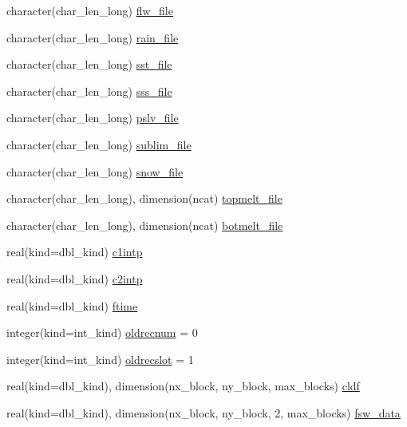 \begin{DoxyCompactItemize}
\item 
character(char\_\-len\_\-long) \hyperlink{namespaceice__forcing_a80a3c80bad2ac9ab38aff61fdaf8084e}{flw\_\-file}
\item 
character(char\_\-len\_\-long) \hyperlink{namespaceice__forcing_a872adfb9cc20037a1b0dc19f317438bd}{rain\_\-file}
\item 
character(char\_\-len\_\-long) \hyperlink{namespaceice__forcing_a33afd2f71d0f18c27e6a2e78388dbb31}{sst\_\-file}
\item 
character(char\_\-len\_\-long) \hyperlink{namespaceice__forcing_a679cbae21b157e961355e2d69701a241}{sss\_\-file}
\item 
character(char\_\-len\_\-long) \hyperlink{namespaceice__forcing_a6aaf5d68f7a6e2eca9949390469c09eb}{pslv\_\-file}
\item 
character(char\_\-len\_\-long) \hyperlink{namespaceice__forcing_a91c5310add7d3da3da2f948d150844ca}{sublim\_\-file}
\item 
character(char\_\-len\_\-long) \hyperlink{namespaceice__forcing_aa253506c47f71090fd11a5b309eecf7e}{snow\_\-file}
\item 
character(char\_\-len\_\-long), dimension(ncat) \hyperlink{namespaceice__forcing_a22a86e9e628aeff874655d16792b2637}{topmelt\_\-file}
\item 
character(char\_\-len\_\-long), dimension(ncat) \hyperlink{namespaceice__forcing_a0278acba1215b398580f3e503a8baf11}{botmelt\_\-file}
\item 
real(kind=dbl\_\-kind) \hyperlink{namespaceice__forcing_a56dcb1f5a344ec3a10ce9138f9418e51}{c1intp}
\item 
real(kind=dbl\_\-kind) \hyperlink{namespaceice__forcing_ad041327090c6188e198972d2e2162197}{c2intp}
\item 
real(kind=dbl\_\-kind) \hyperlink{namespaceice__forcing_a7818997d422d32d4d238d866a60e50a7}{ftime}
\item 
integer(kind=int\_\-kind) \hyperlink{namespaceice__forcing_ad802bdcf2b496e0e3b0cf226abe288ec}{oldrecnum} = 0
\item 
integer(kind=int\_\-kind) \hyperlink{namespaceice__forcing_abf29b2295f18d12d51a4d993a2589770}{oldrecslot} = 1
\item 
real(kind=dbl\_\-kind), dimension(nx\_\-block, ny\_\-block, max\_\-blocks) \hyperlink{namespaceice__forcing_a251b0646126ab48de9758116bec0c414}{cldf}
\item 
real(kind=dbl\_\-kind), dimension(nx\_\-block, ny\_\-block, 2, max\_\-blocks) \hyperlink{namespaceice__forcing_a423a50a8e4373aae7be0c11fe1ab7e0f}{fsw\_\-data}

\end{DoxyCompactItemize}
